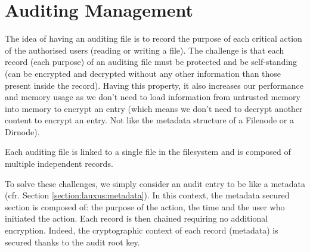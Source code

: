 \documentclass[../main.tex]{subfiles}
\begin{document}
\section{Auditing Management}
\label{section:lauxus:audit}
\par The idea of having an auditing file is to record the purpose of each critical action of the authorised users (reading or writing a file). The challenge is that each record (each purpose) of an auditing file must be protected and be self-standing (can be encrypted and decrypted without any other information than those present inside the record). Having this property, it also increases our performance and memory usage as we don't need to load information from untrusted memory into memory to encrypt an entry (which means we don't need to decrypt another content to encrypt an entry. Not like the metadata structure of a Filenode or a Dirnode).
\par Each auditing file is linked to a single file in the filesystem and is composed of multiple independent records.
\par To solve these challenges, we simply consider an audit entry to be like a metadata (cfr. Section \ref{section:lauxus:metadata}). In this context, the metadata secured section is composed of: the purpose of the action, the time and the user who initiated the action. Each record is then chained requiring no additional encryption. Indeed, the cryptographic context of each record (metadata) is secured thanks to the audit root key.
\end{document}
